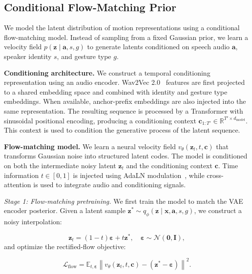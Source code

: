 \subsection{Conditional Flow-Matching Prior}
\label{sec:prior}
We model the latent distribution of motion representations using a conditional flow-matching model.
Instead of sampling from a fixed Gaussian prior, we learn a velocity field $p(\mathbf{z} \mid \mathbf{a}, s, g)$ to generate latents conditioned on speech audio $\mathbf{a}$, speaker identity $s$, and gesture type $g$.

\noindent \textbf{Conditioning architecture.}
We construct a temporal conditioning representation using an audio encoder.
Wav2Vec 2.0~\cite{wav2vec2} features are first projected to a shared embedding space and combined with identity and gesture type embeddings.
When available, anchor-prefix embeddings are also injected into the same representation.
The resulting sequence is processed by a Transformer with sinusoidal positional encoding, producing a conditioning context $\mathbf{c}_{1:T'} \in \mathbb{R}^{T' \times d_\text{model}}$.
This context is used to condition the generative process of the latent sequence.

\noindent \textbf{Flow-matching model.}
We learn a neural velocity field $v_\theta(\mathbf{z}_t, t, \mathbf{c})$ that transforms Gaussian noise into structured latent codes.
The model is conditioned on both the intermediate noisy latent $\mathbf{z}_t$ and the conditioning context $\mathbf{c}$.
Time information $t \in [0,1]$ is injected using AdaLN modulation~\cite{dit}, while cross-attention is used to integrate audio and conditioning signals.

\noindent \emph{Stage 1: Flow-matching pretraining.}
We first train the model to match the VAE encoder posterior.
Given a latent sample $\mathbf{z}^* \sim q_\phi(\mathbf{z} \mid \mathbf{x}, \mathbf{a}, s, g)$, we construct a noisy interpolation:

\begin{equation}
    \mathbf{z}_t = (1 - t)\boldsymbol{\varepsilon} + t\mathbf{z}^*, \quad \boldsymbol{\varepsilon} \sim \mathcal{N}(\mathbf{0}, \mathbf{I}),
\end{equation}
and optimize the rectified-flow objective:

\begin{equation}
    \mathcal{L}_\text{flow} =
    \mathbb{E}_{t, \boldsymbol{\varepsilon}}
    \left\| v_\theta(\mathbf{z}_t, t, \mathbf{c}) - (\mathbf{z}^* - \boldsymbol{\varepsilon}) \right\|^2.
\end{equation}

